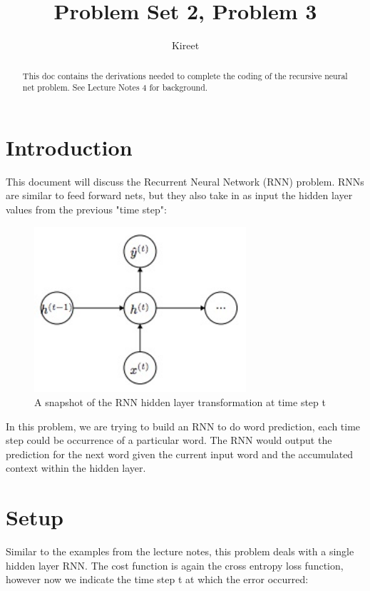 \documentclass[]{article}
\title{Problem Set 2, Problem 3}
\author{Kireet}
\begin{document}
\maketitle

\begin{abstract}
This doc contains the derivations needed to complete the coding of the recursive neural net problem. See Lecture Notes 4 for background.
\end{abstract}

\newpage
\tableofcontents
\newpage

\section{Introduction}
This document will discuss the Recurrent Neural Network (RNN) problem. RNNs are similar to feed forward nets, but they also take in as input the hidden layer values from the previous "time step":
 
\begin{figure}[H]
	\centering
	\includegraphics[width=0.7\textwidth]{rnn-timestep}
	\caption{A snapshot of the RNN hidden layer transformation at time step t}
	\label{fig:neural-net}
\end{figure}

In this problem, we are trying to build an RNN to do word prediction, each time step could be occurrence of a particular word. The RNN would output the prediction for the next word given the current input word and the accumulated context within the hidden layer.

\section{Setup}
Similar to the examples from the lecture notes, this problem deals with a single hidden layer RNN. The cost function is again the cross entropy loss function, however now we indicate the time step t at which the error occurred:
\end{document}
